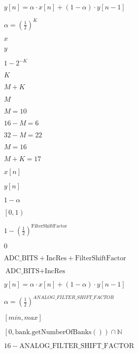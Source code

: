 \documentclass{article}
\begin{document}
$ y[n] = \alpha·x[n]+(1-\alpha)·y[n-1] $
\pagebreak

$ \alpha = \left(\frac{1}{2}\right)^{K} $
\pagebreak

$ x $
\pagebreak

$ y $
\pagebreak

$ 1 - 2^{-K} $
\pagebreak

$ K $
\pagebreak

$ M + K $
\pagebreak

$ M $
\pagebreak

$ M = 10 $
\pagebreak

$ 16 - M = 6 $
\pagebreak

$ 32 - M = 22 $
\pagebreak

$ M = 16 $
\pagebreak

$ M + K = 17 $
\pagebreak

$ x[n] $
\pagebreak

$ y[n] $
\pagebreak

$1-\alpha$
\pagebreak

$ \left[0,1\right) $
\pagebreak

$ 1 - \left(\frac{1}{2}\right)^{\text{FilterShiftFactor}} $
\pagebreak

$0$
\pagebreak

$ \text{ADC_BITS} + \text{IncRes} + 
         \text{FilterShiftFactor} $
\pagebreak

$ \text{ADC_BITS} + \text{IncRes} $
\pagebreak

$ y[n] = \alpha\cdot x[n] + (1-\alpha)\cdot y[n-1] $
\pagebreak

$ \alpha = \left(\frac{1}{2}\right)^{ANALOG\_FILTER\_SHIFT\_FACTOR} $
\pagebreak

$[min, max]$
\pagebreak

$ \left[0, \mathrm{bank.getNumberOfBanks()}\right) \cap 
           \mathbb{N} $
\pagebreak

$ 16 - 
         \mathrm{ANALOG\_FILTER\_SHIFT\_FACTOR} $
\pagebreak
\end{document}
